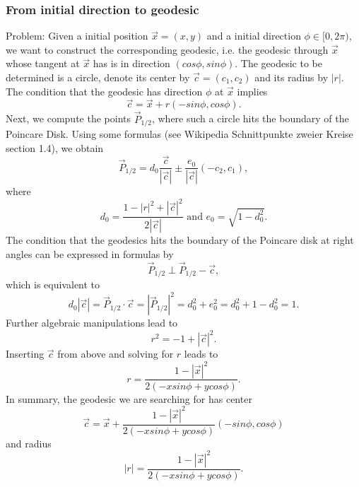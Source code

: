\documentclass{article}
\begin{document}
\subsubsection{From initial direction to geodesic}
Problem: Given a initial position $\vec{x}=(x,y)$ and a initial direction $\phi\in [0,2\pi)$, we want to construct the corresponding geodesic, i.e. the geodesic through $\vec{x}$ whose tangent at $\vec{x}$ has is in direction $(cos\phi,sin\phi)$. The geodesic to be determined is a circle, denote its center by $\vec{c}=(c_1,c_2)$ and its radius by $|r|$. The condition that the geodesic has direction $\phi$ at $\vec{x}$ implies
\begin{equation*}
	\vec{c} = \vec{x} + r (-sin\phi,cos\phi).
\end{equation*}
Next, we compute the points $\vec{P}_{1/2}$, where such a circle hits the boundary of the Poincare Disk. Using some formulas (see Wikipedia Schnittpunkte zweier Kreise section 1.4), we obtain
\begin{equation*}
	\vec{P}_{1/2} = d_0 \frac{\vec{c}}{|\vec{c}|} \pm \frac{e_0}{|\vec{c}|}(-c_2,c_1), 
\end{equation*}
where 
\begin{equation*}
	d_0 = \frac{1-|r|^2+|\vec{c}|^2}{2 |\vec{c}|} 
	\text{ and } 
	e_0 = \sqrt{1-d_0^2}.
\end{equation*}
The condition that the geodesics hits the boundary of the Poincare disk at right angles can be expressed in formulas by
\begin{equation*}
	\vec{P}_{1/2} \perp \vec{P}_{1/2} - \vec{c},
\end{equation*}
which is equivalent to
\begin{equation*}
	d_0|\vec{c}| = \vec{P}_{1/2} \cdot \vec{c} = |\vec{P}_{1/2}|^2 = d_0^2 + e_0^2 = d_0^2 + 1 - d_0^2 = 1.
\end{equation*}
Further algebraic manipulations lead to 
\begin{equation*}
	r^2 = -1 +|\vec{c}|^2.
\end{equation*}
Inserting $\vec{c}$ from above and solving for $r$ leads to 
\begin{equation*}
	r = \frac{1-|\vec{x}|^2}{2(-x sin\phi+ ycos\phi)}.
\end{equation*}
In summary, the geodesic we are searching for has center
\begin{equation*}
	\vec{c} = \vec{x} + 
	\frac{1-|\vec{x}|^2}{2(-x sin\phi+ ycos\phi)}
	 (-sin\phi,cos\phi)
\end{equation*}
and radius 
\begin{equation*}
	|r| = \frac{1-|\vec{x}|^2}{2(-x sin\phi+ ycos\phi)}.
\end{equation*}
\end{document}
